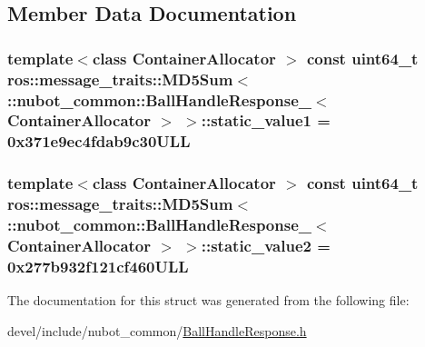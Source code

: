 \subsection{Member Data Documentation}
\hypertarget{structros_1_1message__traits_1_1MD5Sum_3_01_1_1nubot__common_1_1BallHandleResponse___3_01ContainerAllocator_01_4_01_4_a3cb1ec6d97db5e54ed21acfe221f7ef8}{
\subsubsection[{static\-\_\-value1}]{\setlength{\rightskip}{0pt plus 5cm}template$<$class Container\-Allocator $>$ const uint64\-\_\-t ros\-::message\-\_\-traits\-::\-M\-D5\-Sum$<$ \-::{\bf nubot\-\_\-common\-::\-Ball\-Handle\-Response\-\_\-}$<$ Container\-Allocator $>$ $>$\-::static\-\_\-value1 = 0x371e9ec4fdab9c30\-U\-L\-L\hspace{0.3cm}{\ttfamily [static]}}}\label{structros_1_1message__traits_1_1MD5Sum_3_01_1_1nubot__common_1_1BallHandleResponse___3_01ContainerAllocator_01_4_01_4_a3cb1ec6d97db5e54ed21acfe221f7ef8}
\hypertarget{structros_1_1message__traits_1_1MD5Sum_3_01_1_1nubot__common_1_1BallHandleResponse___3_01ContainerAllocator_01_4_01_4_a9c2c2a5fccc47f7093ba1946610b4c08}{
\subsubsection[{static\-\_\-value2}]{\setlength{\rightskip}{0pt plus 5cm}template$<$class Container\-Allocator $>$ const uint64\-\_\-t ros\-::message\-\_\-traits\-::\-M\-D5\-Sum$<$ \-::{\bf nubot\-\_\-common\-::\-Ball\-Handle\-Response\-\_\-}$<$ Container\-Allocator $>$ $>$\-::static\-\_\-value2 = 0x277b932f121cf460\-U\-L\-L\hspace{0.3cm}{\ttfamily [static]}}}\label{structros_1_1message__traits_1_1MD5Sum_3_01_1_1nubot__common_1_1BallHandleResponse___3_01ContainerAllocator_01_4_01_4_a9c2c2a5fccc47f7093ba1946610b4c08}


The documentation for this struct was generated from the following file\-:\begin{DoxyCompactItemize}
\item 
devel/include/nubot\-\_\-common/\hyperlink{BallHandleResponse_8h}{Ball\-Handle\-Response.\-h}\end{DoxyCompactItemize}
